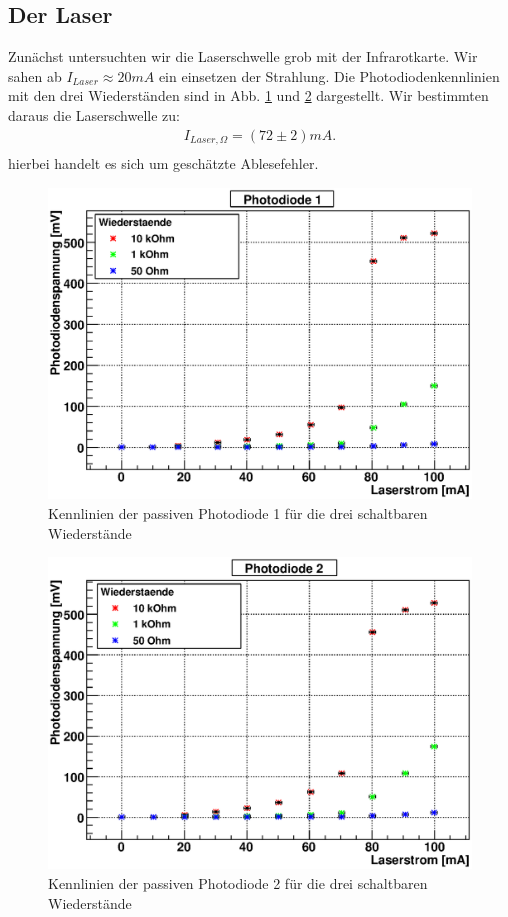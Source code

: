 \documentclass[12pt]{article}
\begin{document}
\subsection{Der Laser}
Zunächst untersuchten wir die Laserschwelle grob mit der Infrarotkarte. Wir sahen ab $I_{Laser} \approx 20 mA$ ein einsetzen der Strahlung.
Die Photodiodenkennlinien mit den drei Wiederständen sind in Abb. \ref{pdkennlinien1} und \ref{pdkennlinien2} dargestellt. Wir bestimmten daraus die Laserschwelle zu:
\begin{align*}
 I_{Laser, \Omega} = (72 \pm 2) mA. \\
\end{align*}
hierbei handelt es sich um geschätzte Ablesefehler.
\begin{figure}[H]
 \includegraphics[width=0.9\linewidth]{pictures/pd_kenn1.eps}
 \caption{Kennlinien der passiven Photodiode 1 für die drei schaltbaren Wiederstände}
 \label{pdkennlinien1}
\end{figure}
\begin{figure}[H]
 \includegraphics[width=0.9\linewidth]{pictures/pd_kenn2.eps}
 \caption{Kennlinien der passiven Photodiode 2 für die drei schaltbaren Wiederstände}
 \label{pdkennlinien2}
\end{figure}
\end{document}
